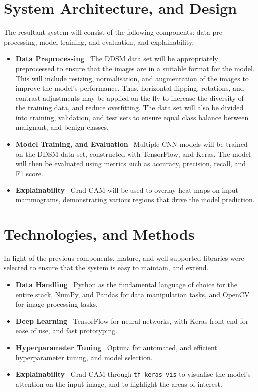 \documentclass[../main]{subfiles}
\begin{document}
\section{System Architecture, and Design}
The resultant system will consist of the following components: data pre-processing, model training, and evaluation, and explainability.

\begin{itemize}
	\item \textbf{Data Preprocessing} \textemdash\ The DDSM data set will be appropriately preprocessed to ensure that the images are in a suitable format for the model. This will include resizing, normalisation, and augmentation of the images to improve the model's performance. Thus, horizontal flipping, rotations, and contrast adjustments may be applied on the fly to increase the diversity of the training data, and reduce overfitting. The data set will also be divided into training, validation, and test sets to ensure equal class balance between malignant, and benign classes.
	\item \textbf{Model Training, and Evaluation} \textemdash\ Multiple CNN models will be trained on the DDSM data set, constructed with TensorFlow, and Keras. The model will then be evaluated using metrics such as accuracy, precision, recall, and F1 score.
	\item \textbf{Explainability} \textemdash\ Grad-CAM will be used to overlay heat maps on input mammograms, demonstrating various regions that drive the model prediction.
\end{itemize}

\section{Technologies, and Methods}
In light of the previous components, mature, and well-supported libraries were selected to ensure that the system is easy to maintain, and extend.

\begin{itemize}
	\item \textbf{Data Handling} \textemdash\ Python as the fundamental language of choice for the entire stack, NumPy, and Pandas for data manipulation tasks, and OpenCV for image processing tasks.
	\item \textbf{Deep Learning} \textemdash\ TensorFlow for neural networks, with Keras front end for ease of use, and fast prototyping.
	\item \textbf{Hyperparameter Tuning} \textemdash\ Optuna for automated, and efficient hyperparameter tuning, and model selection.
    \item \textbf{Explainability} \textemdash\ Grad-CAM through \texttt{tf-keras-vis} to visualise the model's attention on the input image, and to highlight the areas of interest.
\end{itemize}
\end{document}
